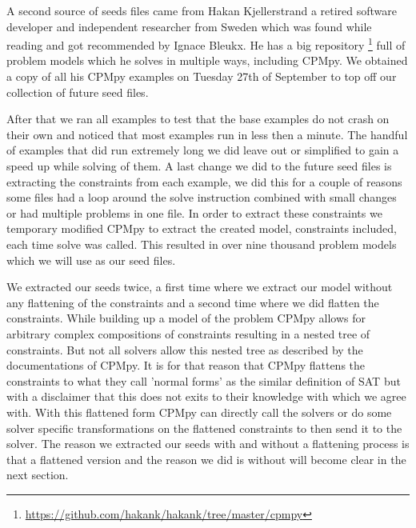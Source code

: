 A second source of seeds files came from Hakan Kjellerstrand a retired software developer and independent researcher from Sweden which was found while reading \cite{18bleukx2022model} and got recommended by Ignace Bleukx. He has a big repository \footnote{\url{https://github.com/hakank/hakank/tree/master/cpmpy}} full of problem models which he solves in multiple ways, including CPMpy. We obtained a copy of all his CPMpy examples on Tuesday 27th of September to top off our collection of future seed files.


After that we ran all examples to test that the base examples do not crash on their own and noticed that most examples run in less then a minute. The handful of examples that did run extremely long we did leave out or simplified to gain a speed up while solving of them. A last change we did to the future seed files is extracting the constraints from each example, we did this for a couple of reasons some files had a loop around the solve instruction combined with small changes or had multiple problems in one file. In order to extract these constraints we temporary modified CPMpy to extract the created model, constraints included, each time solve was called. This resulted in over nine thousand problem models which we will use as our seed files.


We extracted our seeds twice, a first time where we extract our model without any flattening of the constraints and a second time where we did flatten the constraints. While building up a model of the problem CPMpy allows for arbitrary complex compositions of constraints resulting in a nested tree of constraints. But not all solvers allow this nested tree as described by the documentations of CPMpy. It is for that reason that CPMpy flattens the constraints to what they call 'normal forms' as the similar definition of SAT but with a disclaimer that this does not exits to their knowledge with which we agree with. With this flattened form CPMpy can directly call the solvers or do some solver specific transformations on the flattened constraints to then send it to the solver. The reason we extracted our seeds with and without a flattening process is that  a flattened version and the reason we did is without will become clear in the next section.



